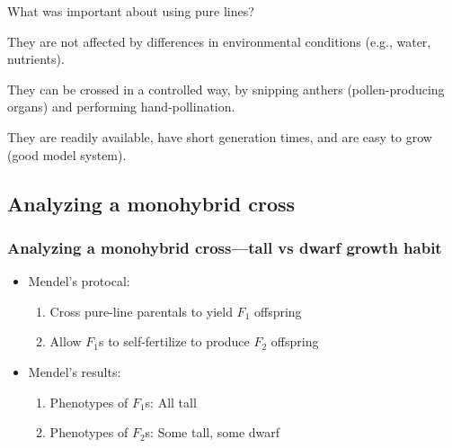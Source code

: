 \begin{frame}
    \begin{clickerquestion}
        \item What was important about using pure lines?
        \begin{clickeroptions}
            \item {}
            \item They are not affected by differences in environmental
                conditions (e.g., water, nutrients).
            \item They can be crossed in a controlled way, by snipping anthers
                (pollen-producing organs) and performing hand-pollination.
            \item They are readily available, have short generation times, and
                are easy to grow (good model system).
        \end{clickeroptions}
    \end{clickerquestion}
\end{frame}

\subsection{Analyzing a monohybrid cross}

\begin{frame}
    \frametitle{Analyzing a monohybrid cross---tall vs dwarf growth habit}

    \begin{itemize}[<+->]
        \item Mendel's  protocal:
            \begin{enumerate}
                \item Cross pure-line parentals to yield $F_1$ offspring
                \item Allow $F_1$s to self-fertilize to produce $F_2$ offspring
            \end{enumerate}

        \item Mendel's results:
            \begin{enumerate}
                \item Phenotypes of $F_1$s: All tall
                \item Phenotypes of $F_2$s: Some tall, some dwarf
            \end{enumerate}
    \end{itemize}

\end{frame}

